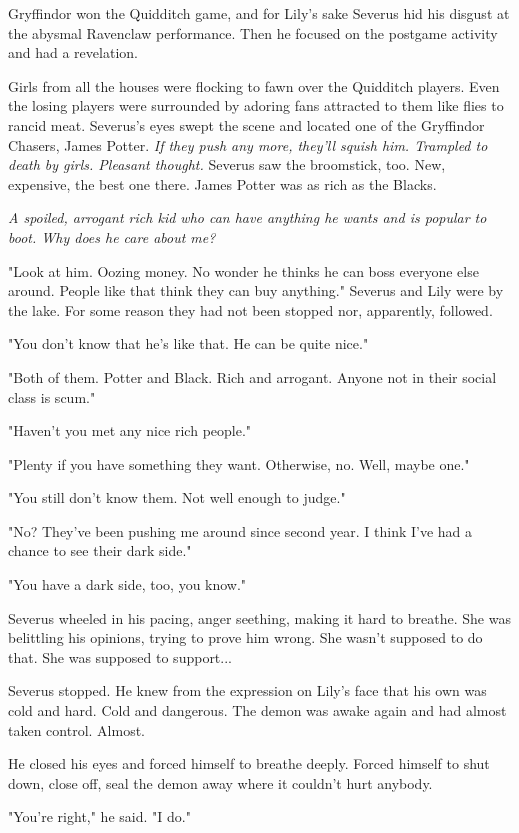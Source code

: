 \documentclass[a4paper,11pt]{article}
\begin{document}
Gryffindor won the Quidditch game, and for Lily's sake Severus hid his disgust at the abysmal Ravenclaw performance. Then he focused on the postgame activity and had a revelation.

Girls from all the houses were flocking to fawn over the Quidditch players. Even the losing players were surrounded by adoring fans attracted to them like flies to rancid meat. Severus's eyes swept the scene and located one of the Gryffindor Chasers, James Potter. \emph{If they push any more, they'll squish him. Trampled to death by girls. Pleasant thought.} Severus saw the broomstick, too. New, expensive, the best one there. James Potter was as rich as the Blacks.

\emph{A spoiled, arrogant rich kid who can have anything he wants and is popular to boot. Why does he care about me?}

"Look at him. Oozing money. No wonder he thinks he can boss everyone else around. People like that think they can buy anything." Severus and Lily were by the lake. For some reason they had not been stopped nor, apparently, followed.

"You don't know that he's like that. He can be quite nice."

"Both of them. Potter and Black. Rich and arrogant. Anyone not in their social class is scum."

"Haven't you met any nice rich people."

"Plenty if you have something they want. Otherwise, no. Well, maybe one."

"You still don't know them. Not well enough to judge."

"No? They've been pushing me around since second year. I think I've had a chance to see their dark side."

"You have a dark side, too, you know."

Severus wheeled in his pacing, anger seething, making it hard to breathe. She was belittling his opinions, trying to prove him wrong. She wasn't supposed to do that. She was supposed to support...

Severus stopped. He knew from the expression on Lily's face that his own was cold and hard. Cold and dangerous. The demon was awake again and had almost taken control. Almost.

He closed his eyes and forced himself to breathe deeply. Forced himself to shut down, close off, seal the demon away where it couldn't hurt anybody.

"You're right," he said. "I do."
\end{document}
